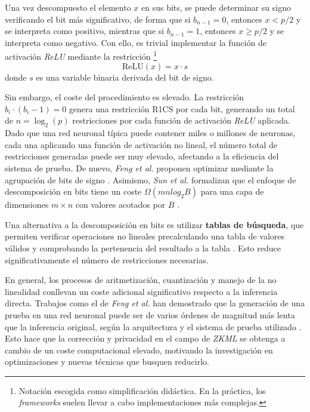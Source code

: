 \documentclass[a4paper, 11pt]{article}
\begin{document}
Una vez descompuesto el elemento $x$ en sus bits, se puede determinar su signo verificando el bit más
significativo, de forma que si $b_{n-1} = 0$, entonces $x < p/2$ y se interpreta como positivo, mientras
que si $b_{n-1} = 1$, entonces $x \geq p/2$ y se interpreta como negativo. Con ello, es trivial
implementar la función de activación \textit{ReLU} mediante la restricción \footnote{Notación
  escogida como simplificación didáctica. En la práctica, los \textit{frameworks} suelen llevar a cabo
  implementaciones más complejas.}
\begin{equation}
  \text{ReLU}(x) = x \cdot s \label{relu_restriccion}
\end{equation}
donde $s$ es una variable binaria derivada del bit de signo.

Sin embargo, el coste del procedimiento es elevado. La restricción $b_i \cdot (b_i - 1) = 0$ genera
una restricción R1CS por cada bit, generando un total de $n = \log_2(p)$ restricciones por cada
función de activación \textit{ReLU} aplicada. Dado que una red neuronal típica puede contener miles
o millones de neuronas, cada una aplicando una función de activación no lineal, el número total de
restricciones generadas puede ser muy elevado, afectando a la eficiencia del sistema de prueba.
De nuevo, \textit{Feng et al.} proponen optimizar mediante la agrupación de bits de signo \cite{feng2021zen}.
Asimismo, \textit{Sun et al.} formalizan que el enfoque de descomposición en bits tiene un coste
$\Omega(mn log_2 B)$ para una capa de dimensiones $m \times n$ con valores acotados por $B$
\cite{sun2024zkllm}.

Una alternativa a la descomposición en bits es utilizar \textbf{tablas de búsqueda}, que permiten
verificar operaciones no lineales precalculando una tabla de valores válidos y comprobando la
pertenencia del resultado a la tabla \cite{plookup2020}. Esto reduce significativamente el número de
restricciones necesarias.

En general, los procesos de aritmetización, cuantización y manejo de la no linealidad conllevan un
coste adicional significativo respecto a la inferencia directa. Trabajos como el de \textit{Feng et al.}
han demostrado que la generación de una prueba en una red neuronal puede ser de varios órdenes de
magnitud más lenta que la inferencia original, según la arquitectura y el sistema de prueba utilizado
\cite{feng2021zen}. Esto hace que la corrección y privacidad en el campo de \textit{ZKML} se obtenga
a cambio de un coste computacional elevado, motivando la investigación en optimizaciones y nuevas
técnicas que busquen reducirlo.
\end{document}
